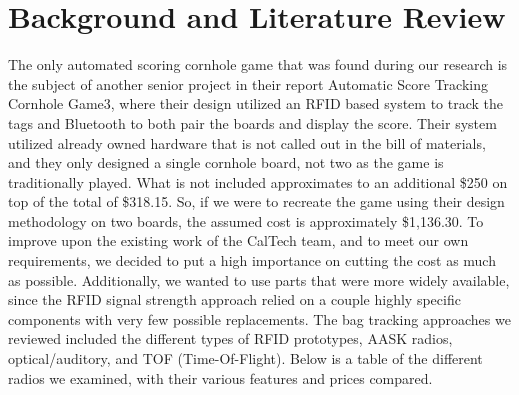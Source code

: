 \documentclass{article}
\begin{document}
\section{Background and Literature Review}
The only automated scoring cornhole game that was found during our research is the subject of another senior project in their report Automatic Score Tracking Cornhole Game3, where their design utilized an RFID based system to track the tags and Bluetooth to both pair the boards and display the score. Their system utilized already owned hardware that is not called out in the bill of materials, and they only designed a single cornhole board, not two as the game is traditionally played. What is not included approximates to an additional \$250 on top of the total of \$318.15. So, if we were to recreate the game using their design methodology on two boards, the assumed cost is approximately \$1,136.30. 
\newpage
To improve upon the existing work of the CalTech team, and to meet our own requirements, we decided to put a high importance on cutting the cost as much as possible. Additionally, we wanted to use parts that were more widely available, since the RFID signal strength approach relied on a couple highly specific components with very few possible replacements. The bag tracking approaches we reviewed included the different types of RFID prototypes, AASK radios, optical/auditory, and TOF (Time-Of-Flight). Below is a table of the different radios we examined, with their various features and prices compared. 
\end{document}
